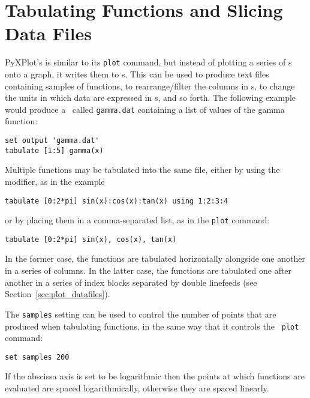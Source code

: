 \section{Tabulating Functions and Slicing Data Files}
\label{sec:tabulate}

PyXPlot's  is similar to its {\tt plot} command, but instead
of plotting a series of \datapoint s onto a graph, it writes them to \datafile
s. This can be used to produce text files containing samples of functions, to
rearrange/filter the columns in \datafile s, to change the units in which data
are expressed in \datafile s, and so forth.  The following example would produce
a \datafile\ called {\tt gamma.dat} containing a list of values of the gamma
function:

\begin{verbatim}
set output 'gamma.dat'
tabulate [1:5] gamma(x)
\end{verbatim}

\noindent Multiple functions may be tabulated into the same file, either by
using the  modifier, as in the example

\begin{verbatim}
tabulate [0:2*pi] sin(x):cos(x):tan(x) using 1:2:3:4
\end{verbatim}

\noindent or by placing them in a comma-separated list, as in the {\tt plot}
command:

\begin{verbatim}
tabulate [0:2*pi] sin(x), cos(x), tan(x)
\end{verbatim}

In the former case, the functions are tabulated horizontally alongside one
another in a series of columns. In the latter case, the functions are tabulated
one after another in a series of index blocks separated by double linefeeds
(see Section~\ref{sec:plot_datafiles}).

The {\tt samples} setting can be used to control the number of points that are
produced when tabulating functions, in the same way that it controls the {\tt
plot} command:

\begin{verbatim}
set samples 200
\end{verbatim}

\noindent If the abscissa axis is set to be logarithmic then the points at which
functions are evaluated are spaced logarithmically, otherwise they are spaced
linearly.

